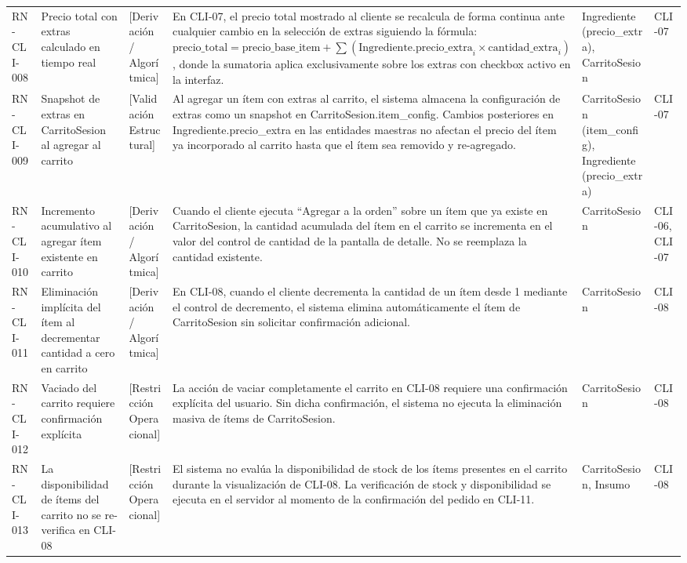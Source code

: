 \begin{landscape}
\begin{longtable}[c]{l p{2.1cm} p{2.1cm} p{8cm} p{4cm} p{3cm}}
RN-CLI-008 & Precio total con extras calculado en tiempo real & [Derivación / Algorítmica] & En CLI-07, el precio total mostrado al cliente se recalcula de forma continua ante cualquier cambio en la selección de extras siguiendo la fórmula: $\text{precio\_total} = \text{precio\_base\_item} + \sum (\text{Ingrediente.precio\_extra}_i \times \text{cantidad\_extra}_i)$, donde la sumatoria aplica exclusivamente sobre los extras con checkbox activo en la interfaz. & Ingrediente (precio\_extra), CarritoSesion & CLI-07 \\
\addlinespace
RN-CLI-009 & Snapshot de extras en CarritoSesion al agregar al carrito & [Validación Estructural] & Al agregar un ítem con extras al carrito, el sistema almacena la configuración de extras como un snapshot en CarritoSesion.item\_config. Cambios posteriores en Ingrediente.precio\_extra en las entidades maestras no afectan el precio del ítem ya incorporado al carrito hasta que el ítem sea removido y re-agregado. & CarritoSesion (item\_config), Ingrediente (precio\_extra) & CLI-07 \\
\addlinespace
RN-CLI-010 & Incremento acumulativo al agregar ítem existente en carrito & [Derivación / Algorítmica] & Cuando el cliente ejecuta ``Agregar a la orden'' sobre un ítem que ya existe en CarritoSesion, la cantidad acumulada del ítem en el carrito se incrementa en el valor del control de cantidad de la pantalla de detalle. No se reemplaza la cantidad existente. & CarritoSesion & CLI-06, CLI-07 \\
\addlinespace
RN-CLI-011 & Eliminación implícita del ítem al decrementar cantidad a cero en carrito & [Derivación / Algorítmica] & En CLI-08, cuando el cliente decrementa la cantidad de un ítem desde 1 mediante el control de decremento, el sistema elimina automáticamente el ítem de CarritoSesion sin solicitar confirmación adicional. & CarritoSesion & CLI-08 \\
\addlinespace
RN-CLI-012 & Vaciado del carrito requiere confirmación explícita & [Restricción Operacional] & La acción de vaciar completamente el carrito en CLI-08 requiere una confirmación explícita del usuario. Sin dicha confirmación, el sistema no ejecuta la eliminación masiva de ítems de CarritoSesion. & CarritoSesion & CLI-08 \\
\addlinespace
RN-CLI-013 & La disponibilidad de ítems del carrito no se re-verifica en CLI-08 & [Restricción Operacional] & El sistema no evalúa la disponibilidad de stock de los ítems presentes en el carrito durante la visualización de CLI-08. La verificación de stock y disponibilidad se ejecuta en el servidor al momento de la confirmación del pedido en CLI-11. & CarritoSesion, Insumo & CLI-08 \\
\end{longtable}
\endgroup


\end{landscape}
